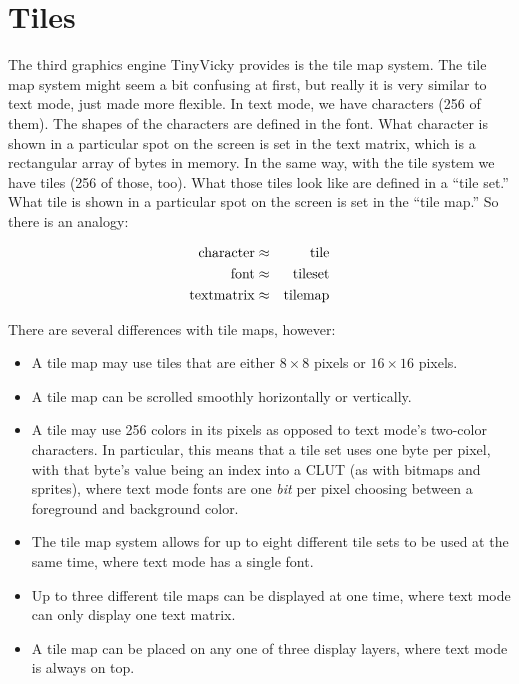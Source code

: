 \chapter{Tiles}
The third graphics engine TinyVicky provides is the tile map system. The tile map system might seem a bit confusing at first, but really it is very similar to text mode, just made more flexible. In text mode, we have characters (256 of them). The shapes of the characters are defined in the font. What character is shown in a particular spot on the screen is set in the text matrix, which is a rectangular array of bytes in memory. In the same way, with the tile system we have tiles (256 of those, too). What those tiles look like are defined in a ``tile set.'' What tile is shown in a particular spot on the screen is set in the ``tile map.'' So there is an analogy:

\begin{eqnarray*}
    {\rm character} & \approx & {\rm tile} \\
    {\rm font} & \approx & {\rm tile set} \\
    {\rm text matrix} & \approx & {\rm tile map} \\
\end{eqnarray*}

There are several differences with tile maps, however:

\begin{itemize}
    \item A tile map may use tiles that are either $8 \times 8$ pixels or $16 \times 16$ pixels.

    \item A tile map can be scrolled smoothly horizontally or vertically.

    \item A tile may use 256 colors in its pixels as opposed to text mode's two-color characters. In particular, this means that a tile set uses one byte per pixel, with that byte's value being an index into a CLUT (as with bitmaps and sprites), where text mode fonts are one {\em bit} per pixel choosing between a foreground and background color.

    \item The tile map system allows for up to eight different tile sets to be used at the same time, where text mode has a single font.

    \item Up to three different tile maps can be displayed at one time, where text mode can only display one text matrix.

    \item A tile map can be placed on any one of three display layers, where text mode is always on top.
\end{itemize}

